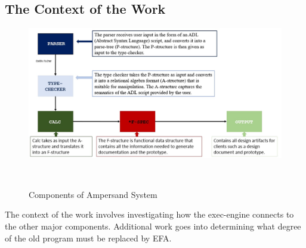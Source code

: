 \documentclass[12pt]{report}
\begin{document}
\subsection{The Context of the Work}\label{sec:ContextOfWork}
\begin{figure}[!htb]
    \centering
    \includegraphics[width=\textwidth]{../figures/ampersand_parts}
    \caption{Components of Ampersand System}~\label{fig:AmpersandParts}
\end{figure}

The context of the work involves investigating how the exec-engine connects to 
the other major components. Additional work goes into determining what degree 
of the old program must be replaced by EFA.
\end{document}
